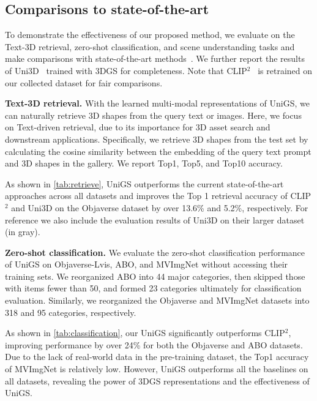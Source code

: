 \subsection{Comparisons to state-of-the-art}
\vspace{-2mm}

To demonstrate the effectiveness of our proposed method, we evaluate \name{} on the Text-3D retrieval, zero-shot classification, and scene understanding tasks and make comparisons with state-of-the-art methods~\citep{zeng2023clip2, zhou2024uni3d}. We further report the results of Uni3D~\citep{zhou2024uni3d} trained with 3DGS for completeness. Note that CLIP$^2$~\citep{zeng2023clip2} is retrained on our collected dataset for fair comparisons.

\textbf{Text-3D retrieval.}
With the learned multi-modal representations of UniGS, we can naturally retrieve 3D shapes from the query text or images. Here, we focus on Text-driven retrieval, due to its importance for 3D asset search and downstream applications. Specifically, we retrieve 3D shapes from the test set by calculating the cosine similarity between the embedding of the query text prompt and 3D shapes in the gallery. We report Top1, Top5, and Top10 accuracy. %

As shown in \cref{tab:retrieve}, UniGS outperforms the current state-of-the-art approaches across all datasets and improves the Top 1 retrieval accuracy of CLIP$^2$ and Uni3D on the Objaverse dataset by over 13.6\% and 5.2\%, respectively. 
%
For reference we also include the evaluation results of Uni3D on their larger dataset (in gray).

\textbf{Zero-shot classification.} We evaluate the zero-shot classification performance of UniGS on Objaverse-Lvis, ABO, and MVImgNet without accessing their training sets. We reorganized ABO into 44 major categories, then skipped those with items fewer than 50, and formed 23 categories ultimately for classification evaluation. Similarly, we reorganized the Objaverse and MVImgNet datasets into 318 and 95 categories, respectively.

As shown in \cref{tab:classification}, our UniGS significantly outperforms CLIP$^2$, improving performance by over 24\% for both the Objaverse and ABO datasets. Due to the lack of real-world data in the pre-training dataset, the Top1 accuracy of MVImgNet is relatively low. However, UniGS outperforms all the baselines on all datasets, revealing the power of 3DGS representations and the effectiveness of UniGS. 


